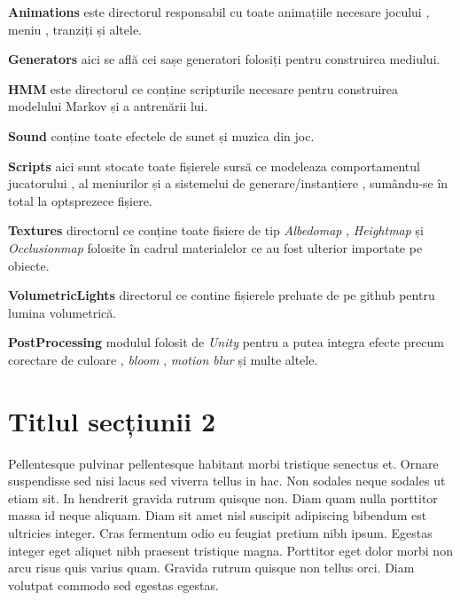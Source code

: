 \textbf{Animations}  este directorul responsabil cu toate animațiile necesare jocului , meniu , tranziți și altele.\par

\textbf{Generators} aici se află cei sașe generatori folosiți pentru construirea mediului.\par

\textbf{HMM} este directorul ce conține scripturile necesare pentru construirea modelului Markov și a antrenării lui.\par

\textbf{Sound} conține toate efectele de sunet și muzica din joc.\par

\textbf{Scripts} aici sunt stocate toate fișierele sursă ce modeleaza comportamentul jucatorului , al meniurilor și a sistemelui de generare/instanțiere , sumându-se în total la optsprezece fișiere.\par

\textbf{Textures} directorul ce conține toate fisiere de tip \textit{Albedomap} , \textit{Heightmap} și \textit{Occlusionmap} folosite în cadrul materialelor ce au fost ulterior importate pe obiecte.\par

\textbf{VolumetricLights} directorul ce contine fișierele preluate de pe github pentru lumina volumetrică.\par

\textbf{PostProcessing} modulul folosit de \textit{Unity} pentru a putea integra efecte precum corectare de culoare , \textit{bloom} , \textit{motion blur} și multe altele.\par


\section{Titlul secțiunii 2}

Pellentesque pulvinar pellentesque habitant morbi tristique senectus et. Ornare suspendisse sed nisi lacus sed viverra tellus in hac. Non sodales neque sodales ut etiam sit. In hendrerit gravida rutrum quisque non. Diam quam nulla porttitor massa id neque aliquam. Diam sit amet nisl suscipit adipiscing bibendum est ultricies integer. Cras fermentum odio eu feugiat pretium nibh ipsum. Egestas integer eget aliquet nibh praesent tristique magna. Porttitor eget dolor morbi non arcu risus quis varius quam. Gravida rutrum quisque non tellus orci. Diam volutpat commodo sed egestas egestas.